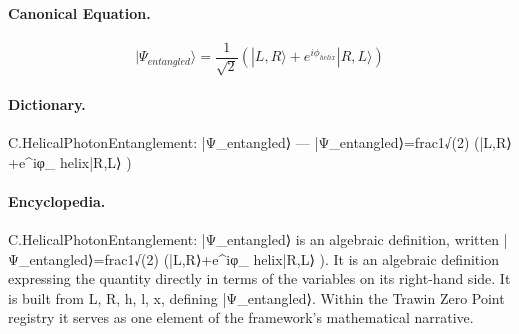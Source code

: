 \paragraph{Canonical Equation.}
\[
|\Psi_{entangled}\rangle=\frac{1}{\sqrt{2}}\left(|L,R\rangle+e^{i\phi_{ helix}}|R,L\rangle\right)
\]

\paragraph{Dictionary.}
C.HelicalPhotonEntanglement: |Ψ\_entangled⟩ — |Ψ\_entangled⟩=frac1√(2) (|L,R⟩+e\textasciicircum{}iφ\_ helix|R,L⟩ )

\paragraph{Encyclopedia.}
C.HelicalPhotonEntanglement: |Ψ\_entangled⟩ is an algebraic definition, written |Ψ\_entangled⟩=frac1√(2) (|L,R⟩+e\textasciicircum{}iφ\_ helix|R,L⟩ ). It is an algebraic definition expressing the quantity directly in terms of the variables on its right-hand side. It is built from L, R, h, l, x, defining |Ψ\_entangled⟩. Within the Trawin Zero Point registry it serves as one element of the framework's mathematical narrative.
